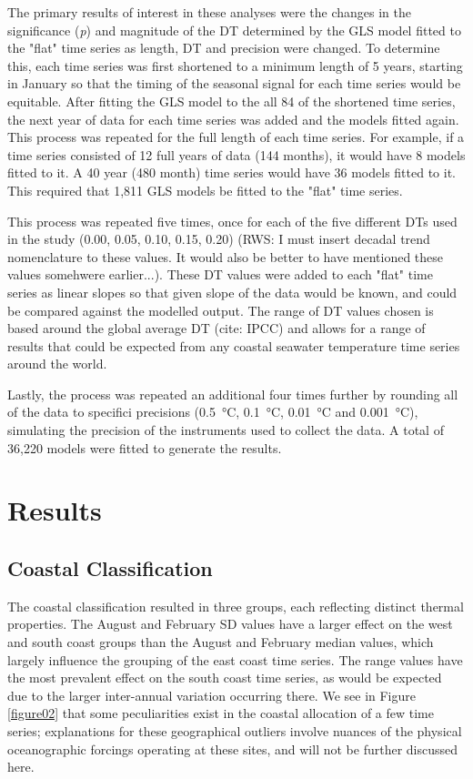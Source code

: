 \documentclass{ametsoc}
\begin{document}
The primary results of interest in these analyses were the changes in the significance (\emph{p}) and magnitude of the DT determined by the GLS model fitted to the "flat" time series as length, DT and precision were changed. To determine this, each time series was first shortened to a minimum length of 5 years, starting in January so that the timing of the seasonal signal for each time series would be equitable. After fitting the GLS model to the all 84 of the shortened time series, the next year of data for each time series was added and the models fitted again. This process was repeated for the full length of each time series. For example, if a time series consisted of 12 full years of data (144 months), it would have 8 models fitted to it. A 40 year (480 month) time series would have 36 models fitted to it. This required that 1,811 GLS models be fitted to the "flat" time series. 

This process was repeated five times, once for each of the five different DTs used in the study (0.00, 0.05, 0.10, 0.15, 0.20) (RWS: I must insert decadal trend nomenclature to these values. It would also be better to have mentioned these values somehwere earlier...). These DT values were added to each "flat" time series as linear slopes so that given slope of the data would be known, and could be compared against the modelled output. The range of DT values chosen is based around the global average DT (cite: IPCC) and allows for a range of results that could be expected from any coastal seawater temperature time series around the world.

Lastly, the process was repeated an additional four times further by rounding all of the data to specifici precisions (\SI{0.5}{\degreeCelsius}, \SI{0.1}{\degreeCelsius}, \SI{0.01}{\degreeCelsius} and \SI{0.001}{\degreeCelsius}), simulating the precision of the instruments used to collect the data. A total of 36,220 models were fitted to generate the results.

\section{Results}

\subsection{Coastal Classification}
The coastal classification resulted in three groups, each reflecting distinct thermal properties. The August and February SD values have a larger effect on the west and south coast groups than the August and February median values, which largely influence the grouping of the east coast time series. The range values have the most prevalent effect on the south coast time series, as would be expected due to the larger inter-annual variation occurring there. We see in Figure \ref{figure02} that some peculiarities exist in the coastal allocation of a few time series; explanations for these geographical outliers involve nuances of the physical oceanographic forcings operating at these sites, and will not be further discussed here.
\end{document}
